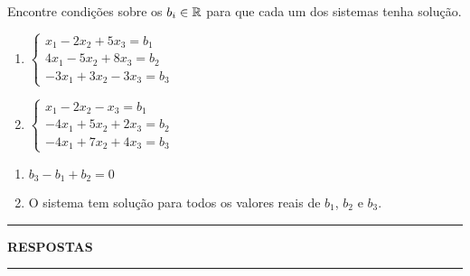 \documentclass[12pt]{exam}
\begin{document}
\begin{exercicio}
  Encontre condi\c{c}\~oes sobre os $b_i \in \mathbb{R}$ para que cada um dos sistemas tenha solu\c{c}\~ao.
  \begin{enumerate}[label={\alph*})]
    \item $\begin{cases}
      x_1 - 2x_2 + 5x_3 = b_1\\
      4x_1 - 5x_2 + 8x_3 = b_2\\
      -3x_1 + 3x_2 - 3x_3 = b_3
    \end{cases}$

    \item $\begin{cases}
      x_1 - 2x_2 - x_3 = b_1\\
      -4x_1 + 5x_2 + 2x_3 = b_2\\
      -4x_1 + 7x_2 + 4x_3 = b_3
    \end{cases}$
  \end{enumerate}
  \begin{solucao}
    \begin{enumerate}[label={\alph*})]
      \item $b_3 - b_1 + b_2 = 0$
      \item O sistema tem solu\c{c}\~ao para todos os valores reais de $b_1$, $b_2$ e $b_3$.
    \end{enumerate}
  \end{solucao}
\end{exercicio}

\newpage
{}
\hrule
\begin{center}
{\large\bf RESPOSTAS}
\end{center}
\hrule

\end{document}
